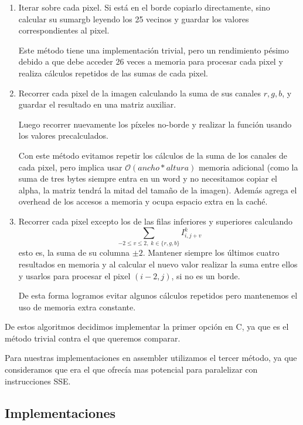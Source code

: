 \begin{enumerate}

\item Iterar sobre cada pixel. Si está en el borde copiarlo directamente, sino calcular su sumargb leyendo los 25 vecinos y guardar los valores correspondientes al pixel.

    Este método tiene una implementación trivial, pero un rendimiento pésimo debido a que debe acceder 26 veces a memoria para procesar cada pixel y realiza cálculos repetidos de las sumas de cada pixel.

\item Recorrer cada pixel de la imagen calculando la suma de sus canales $r,g,b$, y guardar el resultado en una matriz auxiliar.

    Luego recorrer nuevamente los píxeles no-borde y realizar la función usando los valores precalculados.

    Con este método evitamos repetir los cálculos de la suma de los canales de cada pixel, pero implica usar $\mathcal{O}(ancho * altura)$ memoria adicional (como la suma de tres bytes siempre entra en un word y no necesitamos copiar el alpha, la matriz tendrá la mitad del tamaño de la imagen). Además agrega el overhead de los accesos a memoria y ocupa espacio extra en la caché.

\item Recorrer cada pixel excepto los de las filas inferiores y superiores calculando $$\sum_{-2 \le v \le 2,\; k \in \{r,g,b\}} I^k_{i, j+v}$$ esto es, la suma de su columna $\pm 2$.
    Mantener siempre los últimos cuatro resultados en memoria y al calcular el nuevo valor realizar la suma entre ellos y usarlos para procesar el pixel $(i-2,j)$, si no es un borde.

    De esta forma logramos evitar algunos cálculos repetidos pero mantenemos el uso de memoria extra constante.

\end{enumerate}

De estos algoritmos decidimos implementar la primer opción en C, ya que es el método trivial contra el que queremos comparar.

Para nuestras implementaciones en assembler utilizamos el tercer método, ya que consideramos que era el que ofrecía mas potencial para paralelizar con instrucciones SSE.

\subsection{Implementaciones}

